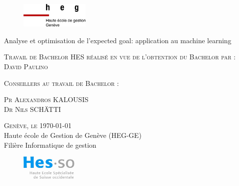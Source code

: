 \documentclass[12pt]{article}
\title{\fulltitle}
\author{\DP}
\date{\today}
\newcommand{\DP}{David Paulino}
\newcommand{\place}{Genève}
\newcommand{\fulltitle}{Analyse et optimisation de l'expected goal: application au machine learning}
\begin{document}
\begin{titlepage}

    \begin{figure}[h]
        \includegraphics[width=0.3\textwidth]{img/logo_heg-ge.jpg}
    \end{figure}

    \vspace*{0.5cm}

    \begin{center}

        \begingroup \linespread{1,75} \selectfont
        {\Large \fulltitle}\\[0,75cm]
        \endgroup



        \vspace{1.5cm}

        \textsc{\large Travail de Bachelor HES réalisé en vue de \newline l’obtention du Bachelor par :}\\[0,50cm]

        \begingroup \linespread{1,5} \selectfont
        \textsc{\large \DP}\\[0,50cm]
        \endgroup


        \vspace{1cm}


        \textsc{\large Conseillers au travail de Bachelor : }

        \begingroup \linespread{1,5} \selectfont
        \textsc{\large Pr Alexandros KALOUSIS}\\[0.1cm]
        \textsc{\large Dr Nils SCHÄTTI}\\[1cm]
        \endgroup


        \begingroup \linespread{1,75} \selectfont
        \textsc{\large \place, le \today}\\[0,1cm]

        {\large Haute école de Gestion de Genève (HEG-GE)}\\[0,1cm]

        {\large Filière Informatique de gestion}\\[0,1cm]
        \endgroup



        \begin{figure}[h]
            \vspace{0.05cm}
            \hspace*{12cm}\includegraphics[width=0.25\textwidth]{img/logo_hes-so.jpg}
        \end{figure}

    \end{center}



    \vfill
\end{titlepage}
\end{document}
